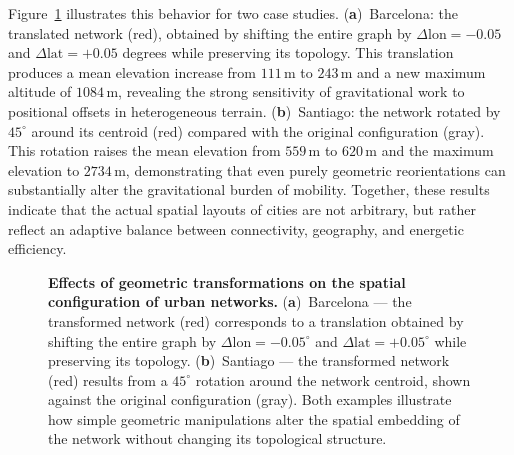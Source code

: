 \documentclass[twocolumn,amsmath,amssymb,floatfix,nature,shownopacs,footinbib,superscriptaddress]{revtex4-1} %
\begin{document}
Figure~\ref{fig:transformations} illustrates this behavior for two case studies.
(\textbf{a})~Barcelona: the translated network (red), obtained by shifting the entire graph by $\Delta \mathrm{lon} = -0.05$ and $\Delta \mathrm{lat} = +0.05$ degrees while preserving its topology. 
This translation produces a mean elevation increase from $111\,\mathrm{m}$ to $243\,\mathrm{m}$ and a new maximum altitude of $1084\,\mathrm{m}$, revealing the strong sensitivity of gravitational work to positional offsets in heterogeneous terrain. 
(\textbf{b})~Santiago: the network rotated by $45^{\circ}$ around its centroid (red) compared with the original configuration (gray). 
This rotation raises the mean elevation from $559\,\mathrm{m}$ to $620\,\mathrm{m}$ and the maximum elevation to $2734\,\mathrm{m}$, demonstrating that even purely geometric reorientations can substantially alter the gravitational burden of mobility. 
Together, these results indicate that the actual spatial layouts of cities are not arbitrary, but rather reflect an adaptive balance between connectivity, geography, and energetic efficiency. 

\begin{figure}[t!]
\centering
\def\svgwidth{.8\textwidth}
  
\caption{\textbf{Effects of geometric transformations on the spatial configuration of urban networks.}
(\textbf{a})~Barcelona — the transformed network (red) corresponds to a translation obtained by shifting the entire graph by $\Delta \mathrm{lon} = -0.05^{\circ}$ and $\Delta \mathrm{lat} = +0.05^{\circ}$ while preserving its topology.
(\textbf{b})~Santiago — the transformed network (red) results from a $45^{\circ}$ rotation around the network centroid, shown against the original configuration (gray).
Both examples illustrate how simple geometric manipulations alter the spatial embedding of the network without changing its topological structure.}
\label{fig:transformations}
\end{figure}
\end{document}
